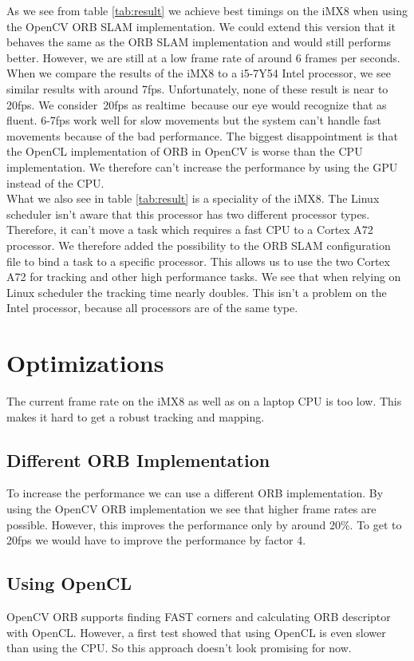 \documentclass[11pt,a4paper,titlepage,oneside]{report}
\begin{document}
As we see from table \ref{tab:result} we achieve best timings on the iMX8 when using the OpenCV ORB SLAM implementation. We could extend this version that it behaves the same as the ORB SLAM implementation and would still performs better. However, we are still at a low frame rate of around 6 frames per seconds. When we compare the results of the iMX8 to a i5-7Y54 Intel processor, we see similar results with around 7fps. Unfortunately, none of these result is near to 20fps. We consider 20fps as realtime because our eye would recognize that as fluent. 6-7fps work well for slow movements but the system can’t handle fast movements because of the bad performance. The biggest disappointment is that the OpenCL implementation of ORB in OpenCV is worse than the CPU implementation. We therefore can’t increase the performance by using the GPU instead of the CPU.\\
What we also see in table \ref{tab:result} is a speciality of the iMX8. The Linux scheduler isn't aware that this processor has two different processor types. Therefore, it can't move a task which requires a fast CPU to a Cortex A72 processor. We therefore added the possibility to the ORB SLAM configuration file to bind a task to a specific processor. This allows us to use the two Cortex A72 for tracking and other high performance tasks. We see that when relying on Linux scheduler the tracking time nearly doubles. This isn't a problem on the Intel processor, because all processors are of the same type.  

\section{Optimizations}

The current frame rate on the iMX8 as well as on a laptop CPU is too low. This makes it hard to get a robust tracking and mapping.

\subsection{Different ORB Implementation}
To increase the performance we can use a different ORB implementation. By using the OpenCV ORB implementation we see that higher frame rates are possible. However, this improves the performance only by around 20\%. To get to 20fps we would have to improve the performance by factor 4.

\subsection{Using OpenCL}
OpenCV ORB supports finding FAST corners and calculating ORB descriptor with OpenCL. However, a first test showed that using OpenCL is even slower than using the CPU. So this approach doesn't look promising for now.
\end{document}
